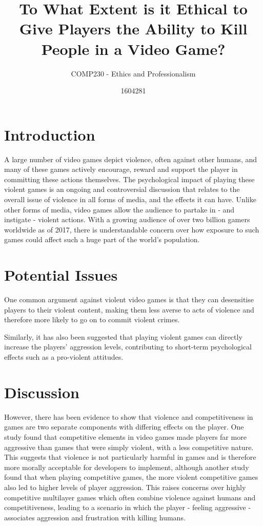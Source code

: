 \documentclass{scrartcl}
\title{To What Extent is it Ethical to Give Players the Ability to Kill People in a Video Game?}
\subtitle{COMP230 - Ethics and Professionalism}
\author{1604281}
\begin{document}
	
	\maketitle
	
	\abstract{}
	
	\section{Introduction}
		A large number of video games depict violence, often against other humans, and many of these games actively encourage, reward and support the player in committing these actions themselves. \cite{esaReport} The psychological impact of playing these violent games is an ongoing and controversial discussion that relates to the overall issue of violence in all forms of media, and the effects it can have. Unlike other forms of media, video games allow the audience to partake in - and instigate - violent actions. With a growing audience of over two billion gamers worldwide as of 2017, there is understandable concern over how exposure to such games could affect such a huge part of the world's population. \cite{numberOfGamers}
		
	
	\section{Potential Issues}
		One common argument against violent video games is that they can desensitise players to their violent content, making them less averse to acts of violence and therefore more likely to go on to commit violent crimes. \cite{devalueViolence} \cite{ExposureLink}
		
		Similarly, it has also been suggested that playing violent games can directly increase the players' aggression levels, contributing to short-term psychological effects such as a pro-violent attitudes. \cite{anderson2007violent}
	
	
	\section{Discussion}
		However, there has been evidence to show that violence and competitiveness in games are two separate components with differing effects on the player. One study found that competitive elements in video games made players far more aggressive than games that were simply violent, with a less competitive nature. \cite{Competativness} This suggests that violence is not particularly harmful in games and is therefore more morally acceptable for developers to implement, although another study found that when playing competitive games, the more violent competitive games also led to higher levels of player aggression. \cite{ViolenceSports} This raises concerns over highly competitive multilayer games which often combine violence against humans and competitiveness, leading to a scenario in which the player - feeling aggressive - associates aggression and frustration with killing humans. 
		
\end{document}
